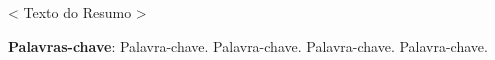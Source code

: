 \begin{resumo}
	
	< Texto do Resumo >
	
	\textbf{Palavras-chave}: Palavra-chave. Palavra-chave. Palavra-chave. Palavra-chave.
\end{resumo}